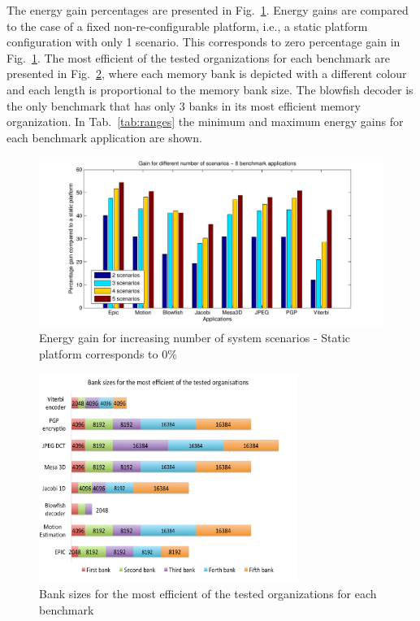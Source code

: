 The energy gain percentages are presented in Fig.~\ref{fig:gainsC}. 
Energy gains are compared to the case of a fixed non-re-configurable platform, i.e., a static platform configuration with only 1 scenario. 
This corresponds to zero percentage gain in Fig.~\ref{fig:gainsC}. 
The most efficient of the tested organizations for each benchmark are presented in Fig.~\ref{fig:banksC}, where each memory bank is depicted with a different colour and each length is proportional to the memory bank size. 
The blowfish decoder is the only benchmark that has only 3 banks in its most efficient memory organization. 
In Tab.~\ref{tab:ranges} the minimum and maximum energy gains for each benchmark application are shown.

\begin{figure}
\centering
\includegraphics[width=\textwidth]{C/6appsGains.pdf}
\caption{Energy gain for increasing number of system scenarios - Static platform corresponds to 0\%}
\label{fig:gainsC}
\end{figure}

\begin{figure}
\centering
\includegraphics[width=0.75\textwidth]{C/banks2.pdf}
\caption{Bank sizes for the most efficient of the tested organizations for each benchmark}
\label{fig:banksC}
\end{figure}

